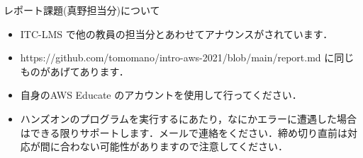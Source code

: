 \documentclass[unicode,11pt]{beamer}
\begin{document}
\begin{frame}{レポート課題(真野担当分)について}

\begin{itemize}
    \item ITC-LMS で他の教員の担当分とあわせてアナウンスがされています．
    \item https://github.com/tomomano/intro-aws-2021/blob/main/report.md に同じものがあげてあります．
    \item 自身のAWS Educate のアカウントを使用して行ってください．
    \item ハンズオンのプログラムを実行するにあたり，なにかエラーに遭遇した場合はできる限りサポートします．メールで連絡をください．締め切り直前は対応が間に合わない可能性がありますので注意してください．
\end{itemize}

\end{frame}
\end{document}
